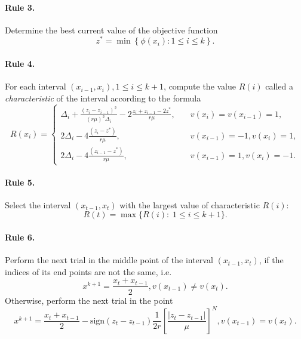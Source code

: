 \documentclass[runningheads]{llncs}
\begin{document}
\paragraph{Rule 3.} Determine the best current value of the objective function
\begin{equation}\label{eq8} 
z^*=\min \left\{ \phi (x_i): 1\leq i \leq k \right\}.
\end{equation}

\paragraph{Rule 4.} For each interval $(x_{i-1},x_i),1 \leq i \leq k+1$, compute the value $R(i)$ called a \textit{characteristic} of the interval according to the formula
\begin{equation}\label{eq9} 
R(x_i)=
  \begin{cases}
    \Delta _i+\frac {{(z_i-z_{i-1})}^2}{{(r \mu)}^2 \Delta _i} - 2 \frac {z_i+z_{i-1}-2z^*}{r \mu}, & {\quad  v(x_i)=v(x_{i-1})=1},\\
    2 \Delta _i-4 \frac {(z_i-z^*)}{r \mu}, & {\quad  v(x_{i-1})=-1, v(x_i)=1},\\
    2 \Delta _i-4 \frac {(z_{i-1}-z^*)}{r \mu}, & {\quad  v(x_{i-1})=1, v(x_i)=-1.}
  \end{cases}
\end{equation}

\paragraph{Rule 5.} Select the interval $(x_{t-1},x_t)$ with the largest value of characteristic $R(i)$:
\[
R(t)= \max\{R(i): \; 1 \leq i \leq k+1\}.
\]

\paragraph{Rule 6.} Perform the next trial in the middle point of the interval $(x_{t-1},x_t)$, if the indices of its end points are not the same, i.e.
\begin{equation}\label{eq10} 
x^{k+1}=\frac {x_t+x_{t-1}}{2}, v(x_{t-1})\neq v(x_t).
\end{equation}
Otherwise, perform the next trial in the point
\begin{equation}\label{eq11} 
x^{k+1}= \frac {x_t+x_{t-1}}{2} -  \text{sign} {(z_t-z_{t-1})} \frac{1}{2r} \left[\frac {{|z_t-z_{t-1}|}}{\mu} \right]^N, v(x_{t-1})=v(x_t).
\end{equation}
\end{document}

